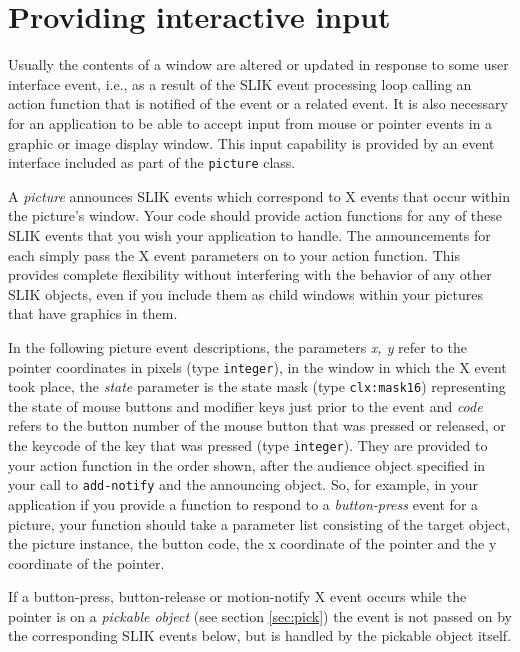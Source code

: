 \documentclass[twoside,openright,11pt]{report}
\newcommand{\tp}[1]{\texttt{#1}}
\begin{document}
\section{Providing interactive input} \label{sec:input}

Usually the contents of a window are altered or updated in response to
some user interface event, i.e., as a result of the SLIK event
processing loop calling an action function that is notified of the
event or a related event.  It is also necessary for an application to
be able to accept input from mouse or pointer events in a graphic or
image display window.  This input capability is provided by an event
interface included as part of the \tp{picture} class.

A \emph{picture} announces SLIK events which correspond to X events
that occur within the picture's window.  Your code should provide
action functions for any of these SLIK events that you wish your
application to handle.  The announcements for each simply pass the X
event parameters on to your action function.  This provides complete
flexibility without interfering with the behavior of any other SLIK
objects, even if you include them as child windows within your
pictures that have graphics in them.


In the following picture event descriptions, the parameters \emph{x,
y} refer to the pointer coordinates in pixels (type \tp{integer}),
in the window in which the X event took place, the \emph{state}
parameter is the state mask (type \tp{clx:mask16}) representing
the state of mouse buttons and modifier keys just prior to the event
and \emph{code} refers to the button number of the mouse button that
was pressed or released, or the keycode of the key that was pressed
(type \tp{integer}).  They are provided to your action function in
the order shown, after the audience object specified in your call to
\tp{add-notify} and the announcing object.  So, for example, in
your application if you provide a function to respond to a
\emph{button-press} event for a picture, your function should take a
parameter list consisting of the target object, the picture instance,
the button code, the x coordinate of the pointer and the y coordinate
of the pointer.

If a button-press, button-release or motion-notify X event occurs
while the pointer is on a \emph{pickable object} (see section
\ref{sec:pick}) the event is not passed on by the corresponding SLIK
events below, but is handled by the pickable object itself.
\end{document}
